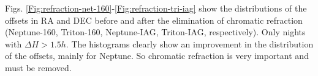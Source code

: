 \documentclass[12pt,a4paper]{report}
\newcommand{\PE}{Perkin-Elmer }
\newcommand{\BC}{Boller \& Chivens }
\begin{document}
Figs. \ref{Fig:refraction-net-160}-\ref{Fig:refraction-tri-iag} show the distributions of the offsets in RA and DEC before and after the elimination of chromatic refraction (Neptune-160, Triton-160, Neptune-IAG, Triton-IAG, respectively). Only nights with $\Delta H > 1.5h$. The histograms clearly show an improvement in the distribution of the offsets, mainly for Neptune. So chromatic refraction is very important and must be removed. %

\end{document}
